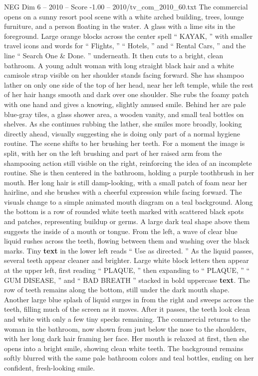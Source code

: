 \begin{textsample}{NEG Dim 6 – 2010 – Score -1.00 – 2010/tv\_com\_2010\_60.txt}  \label{ex:f6_neg_012}
The commercial opens on a sunny resort pool scene with a white arched building, trees, lounge furniture, and a person floating in the water.
A glass with a lime sits in the foreground.
Large orange blocks across the center spell “ KAYAK, ” with smaller travel icons and words for “ Flights, ” “ Hotels, ” and “ Rental Cars, ” and the line “ Search One \& Done. ” underneath.
It then cuts to a bright, clean bathroom.
A young adult woman with long straight black hair and a white camisole strap visible on her shoulder stands facing forward.
She has shampoo lather on only one side of the top of her head, near her left temple, while the rest of her hair hangs smooth and dark over one shoulder.
She rubs the foamy patch with one hand and gives a knowing, slightly amused smile.
Behind her are pale blue-gray tiles, a glass shower area, a wooden vanity, and small teal bottles on shelves.
As she continues rubbing the lather, she smiles more broadly, looking directly ahead, visually suggesting she is doing only part of a normal hygiene routine.
The scene shifts to her brushing her teeth.
For a moment the image is split, with her on the left brushing and part of her raised arm from the shampooing action still visible on the right, reinforcing the idea of an incomplete routine.
She is then centered in the bathroom, holding a purple toothbrush in her mouth.
Her long hair is still damp-looking, with a small patch of foam near her hairline, and she brushes with a cheerful expression while facing forward.
The visuals change to a simple animated mouth diagram on a teal background.
Along the bottom is a row of rounded white teeth marked with scattered black spots and patches, representing buildup or germs.
A large dark teal shape above them suggests the inside of a mouth or tongue.
From the left, a wave of clear blue liquid rushes across the teeth, flowing between them and washing over the black marks.
Tiny \textbf{text} in the lower left reads “ Use as directed. ” As the liquid passes, several teeth appear cleaner and brighter.
Large white block letters then appear at the upper left, first reading “ PLAQUE, ” then expanding to “ PLAQUE, ” “ GUM DISEASE, ” and “ BAD BREATH ” stacked in bold uppercase \textbf{text}.
The row of teeth remains along the bottom, still under the dark mouth shape.
Another large blue splash of liquid surges in from the right and sweeps across the teeth, filling much of the screen as it moves.
After it passes, the teeth look clean and white with only a few tiny specks remaining.
The commercial returns to the woman in the bathroom, now shown from just below the nose to the shoulders, with her long dark hair framing her face.
Her mouth is relaxed at first, then she opens into a bright smile, showing clean white teeth.
The background remains softly blurred with the same pale bathroom colors and teal bottles, ending on her confident, fresh-looking smile.

\end{textsample}
